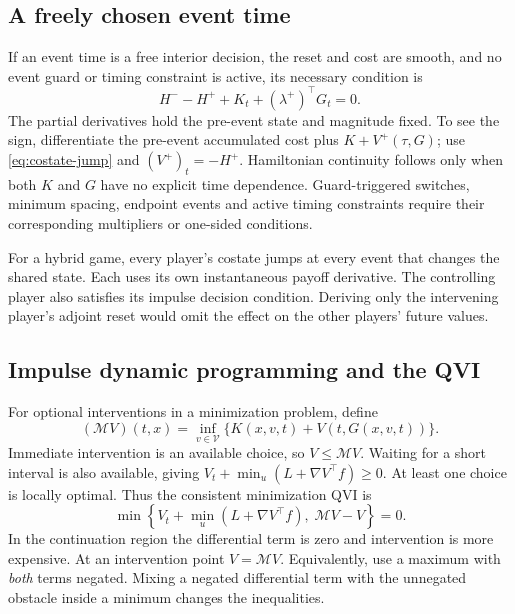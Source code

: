 \documentclass[11pt,a4paper]{article}
\theoremstyle{definition}
\theoremstyle{remark}
\begin{document}
\subsection{A freely chosen event time}
If an event time is a free interior decision, the reset and cost are smooth, and no event guard or timing constraint is active, its necessary condition is
\begin{equation}
\boxed{H^- -H^+ +K_t+(\lambda^+)^\top G_t=0.}
\label{eq:time-jump}
\end{equation}
The partial derivatives hold the pre-event state and magnitude fixed. To see the sign, differentiate the pre-event accumulated cost plus $K+V^+(\tau,G)$; use \eqref{eq:costate-jump} and $(V^+)_t=-H^+$. Hamiltonian continuity follows only when both $K$ and $G$ have no explicit time dependence. Guard-triggered switches, minimum spacing, endpoint events and active timing constraints require their corresponding multipliers or one-sided conditions.

For a hybrid game, every player's costate jumps at every event that changes the shared state. Each uses its own instantaneous payoff derivative. The controlling player also satisfies its impulse decision condition. Deriving only the intervening player's adjoint reset would omit the effect on the other players' future values.

\subsection{Impulse dynamic programming and the QVI}
For optional interventions in a minimization problem, define
\begin{equation}
(\mathcal MV)(t,x)=\inf_{v\in\mathcal V}\{K(x,v,t)+V(t,G(x,v,t))\}.
\end{equation}
Immediate intervention is an available choice, so $V\le\mathcal MV$. Waiting for a short interval is also available, giving
$V_t+\min_u(L+\nabla V^\top f)\ge0$. At least one choice is locally optimal. Thus the consistent minimization QVI is
\begin{equation}
\boxed{\min\left\{V_t+\min_u(L+\nabla V^\top f),\;\mathcal MV-V\right\}=0.}
\label{eq:qvi}
\end{equation}
In the continuation region the differential term is zero and intervention is more expensive. At an intervention point $V=\mathcal MV$. Equivalently, use a maximum with \emph{both} terms negated. Mixing a negated differential term with the unnegated obstacle inside a minimum changes the inequalities.
\end{document}
